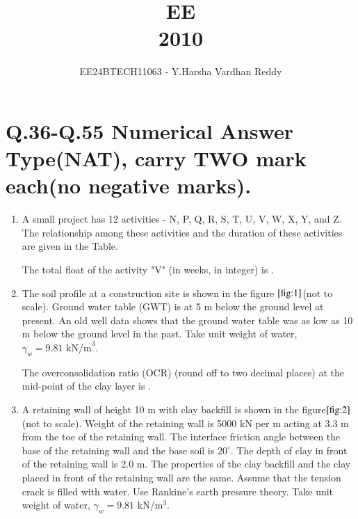 \documentclass[journal]{IEEEtran}
\renewcommand{\thefigure}{\theenumi}
\renewcommand{\thetable}{\theenumi}
\numberwithin{equation}{enumi}
\numberwithin{figure}{enumi}
\renewcommand{\thetable}{\theenumi}
\begin{document}

\vspace{3cm}

\title{EE\\2010}
\author{EE24BTECH11063 - Y.Harsha Vardhan Reddy}
\maketitle

\bigskip

\renewcommand{\thefigure}{\theenumi}
\renewcommand{\thetable}{\theenumi}

\section*{Q.36-Q.55 Numerical Answer Type(NAT), carry TWO mark each(no negative marks).}
\begin{enumerate}
    \item A small project has 12 activities - N, P, Q, R, S, T, U, V, W, X, Y, and Z. The relationship among these activities and the duration of these activities are given in the Table.

  

\begin{table}[!ht]    
  \centering
  
\end{table}

\noindent The total float of the activity "V"  (in weeks, in integer) is \underline{\hspace{3cm}}.
\bigskip
\item 
The soil profile at a construction site is shown in the figure $\ref{fig:1}$(not to scale). Ground water table (GWT) is at 5 m below the ground level at present. An old well data shows that the ground water table was as low as 10 m below the ground level in the past. Take unit weight of water, $\gamma_w = 9.81 \text{ kN/m}^3$.
	\begin{figure}[H]
			\centering
			
			\caption{}
			\label{fig:1}
	\end{figure}


The overconsolidation ratio (OCR) (round off to two decimal places) at the mid-point of the clay layer is \underline{\hspace{2cm}}.
\bigskip

\item A retaining wall of height 10 m with clay backfill is shown in the figure$\ref{fig:2}$ (not to scale). Weight of the retaining wall is 5000 kN per m acting at 3.3 m from the toe of the retaining wall. The interface friction angle between the base of the retaining wall and the base soil is $20^\circ$. The depth of clay in front of the retaining wall is 2.0 m. The properties of the clay backfill and the clay placed in front of the retaining wall are the same. Assume that the tension crack is filled with water. Use Rankine's earth pressure theory. Take unit weight of water, $\gamma_w = 9.81$ kN/m$^3$.


\end{enumerate}
\end{document}
